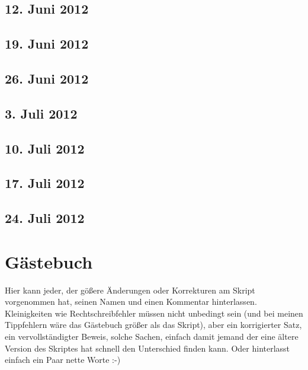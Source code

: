 \documentclass[a4paper, 12pt, numbers=noendperiod, chapterprefix=true]{scrbook}
\theoremstyle{break}
\theoremstyle{nonumberbreak}
\theoremstyle{nonumberplain}
\begin{document}
\newpage
\section{12. Juni 2012}
\setcounter{Aufg}{0}
\setcounter{Loes}{0}

\newpage
\section{19. Juni 2012}
\setcounter{Aufg}{0}
\setcounter{Loes}{0}

\newpage
\section{26. Juni 2012}
\setcounter{Aufg}{0}
\setcounter{Loes}{0}

\newpage
\section{3. Juli 2012}
\setcounter{Aufg}{0}
\setcounter{Loes}{0}

\newpage
\section{10. Juli 2012}
\setcounter{Aufg}{0}
\setcounter{Loes}{0}

\newpage
\section{17. Juli 2012}
\setcounter{Aufg}{0}
\setcounter{Loes}{0}

\newpage
\section{24. Juli 2012}
\setcounter{Aufg}{0}
\setcounter{Loes}{0}



\chapter{G\"astebuch}
Hier kann jeder, der g\"o\ss ere \"Anderungen oder Korrekturen am Skript vorgenommen hat, seinen Namen und einen Kommentar hinterlassen. Kleinigkeiten wie Rechtschreibfehler m\"ussen nicht unbedingt sein (und bei meinen Tippfehlern w\"are das G\"astebuch gr\"o\ss er als das Skript), aber ein korrigierter Satz, ein vervollst\"andigter Beweis, solche Sachen, einfach damit jemand der eine \"altere Version des Skriptes hat schnell den Unterschied finden kann. Oder hinterlasst einfach ein Paar nette Worte :-)
\end{document}
